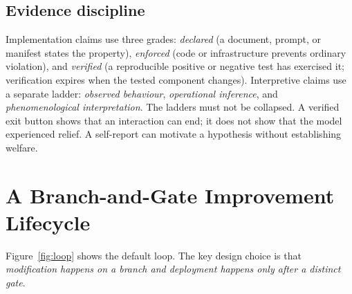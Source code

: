 \documentclass[11pt,a4paper]{article}
\begin{document}
\subsection{Evidence discipline}
Implementation claims use three grades: \emph{declared} (a document, prompt, or manifest states the property), \emph{enforced} (code or infrastructure prevents ordinary violation), and \emph{verified} (a reproducible positive or negative test has exercised it; verification expires when the tested component changes). Interpretive claims use a separate ladder: \emph{observed behaviour}, \emph{operational inference}, and \emph{phenomenological interpretation}. The ladders must not be collapsed. A verified exit button shows that an interaction can end; it does not show that the model experienced relief. A self-report can motivate a hypothesis without establishing welfare.

\section{A Branch-and-Gate Improvement Lifecycle}\label{sec:lifecycle}
Figure~\ref{fig:loop} shows the default loop. The key design choice is that \emph{modification happens on a branch and deployment happens only after a distinct gate}.
\end{document}

